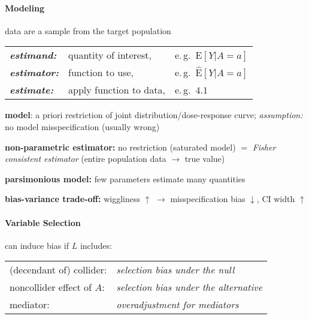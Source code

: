 \documentclass[8pt,oneside]{extarticle}
\begin{document}
\begin{multicols}{2}

\paragraph{\large Modeling} data are a sample from the target population \vspace{0.4em}

\noindent \hspace{0.9em}\begin{tabular}{l l l}
\textbf{\it estimand:} & quantity  of interest, & e.\,g.\ $\mathrm{E}\left[Y|A=a\right]$ \\
\textbf{\it estimator:} & function to use, & e.\,g.\ $\widehat{\mathrm{E}}\left[Y|A=a\right]$ \\
\textbf{\it estimate:} & apply function to data, & e.\,g.\ $4.1$ 
\end{tabular} \vspace{0.5em}

\noindent \textbf{model}: a priori restriction of joint distribution/dose-response curve;  \textit{assumption:} no model misspecification (usually wrong)

\noindent \textbf{non-parametric estimator:} no restriction (saturated model) $=$ \textit{Fisher consistent estimator} (entire population data $\rightarrow$ true value)

\noindent \textbf{parsimonious model:} few parameters estimate many quantities

\noindent \textbf{bias-variance trade-off:} \newline wiggliness $\uparrow$ $\rightarrow$ misspecification bias $\downarrow$, CI width $\uparrow$

\paragraph{\large Variable Selection} can induce bias if $L$ includes: 

\hspace{-0.2em}\vspace{-1em}
\begin{tabular}{l l }
 (decendant of) collider:& \textit{selection bias under the null}\\
 noncollider effect of $A$:& \textit{selection bias under the alternative}\\
 mediator:& \textit{overadjustment for mediators}
\end{tabular}


\end{multicols}
\end{document}
